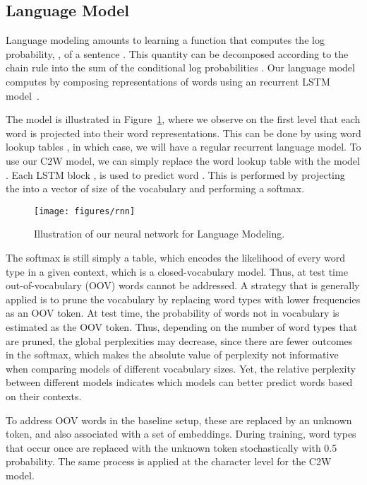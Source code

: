 \documentclass[11pt]{article}
\begin{document}
\begin{CJK*}{UTF8}{gbsn}
\subsection{Language Model}
Language modeling amounts to learning a function that computes the log probability, , of a sentence . This quantity can be decomposed according to the chain rule into the sum of the conditional log probabilities . Our language model computes  by composing representations of words  using an recurrent LSTM model~\cite{mikolov2010recurrent,sundermeyer12:lstm}.

The model is illustrated in Figure~\ref{lm}, where we observe on the first level that each word  is projected into their word representations. This can be done by using word lookup tables , in which case, we will have a regular recurrent language model. To use our C2W model, we can simply replace the word lookup table with the model . Each LSTM block , is used to predict word . This is performed by projecting the  into a vector of size of the vocabulary  and performing a softmax.

\begin{figure}[ht]
\begin{center}
\centerline{\texttt{[image: figures/rnn]}}
\caption{Illustration of our neural network for Language Modeling.}
\label{lm}
\end{center}
\end{figure} 


The softmax is still simply a  table, which encodes the likelihood of every word type in a given context, which is a closed-vocabulary model. Thus, at test time out-of-vocabulary (OOV) words cannot be addressed. A strategy that is generally applied is to prune the vocabulary  by replacing word types with lower frequencies as an OOV token. At test time, the probability of words not in vocabulary is estimated as the OOV token. Thus, depending on the number of word types that are pruned, the global perplexities may decrease, since there are fewer outcomes in the softmax, which makes the absolute value of perplexity not informative when comparing models of different vocabulary sizes. Yet, the relative perplexity between different models indicates which models can better predict words based on their contexts. 

To address OOV words in the baseline setup, these are replaced by an unknown token, and also associated with a set of embeddings. During training, word types that occur once are replaced with the unknown token stochastically with 0.5 probability. The same process is applied at the character level for the C2W model.


\end{CJK*}
\end{document}
